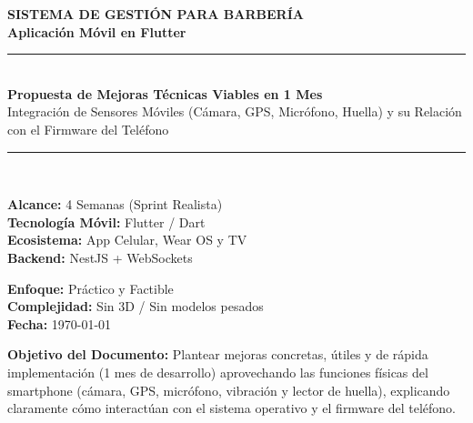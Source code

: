 \documentclass[11pt,a4paper]{article}
\begin{document}

\begin{titlepage}
    \centering
    \vspace*{1.5cm}
    
    {\Huge \textbf{\color{primaryDark}SISTEMA DE GESTIÓN PARA BARBERÍA}}\\[0.4cm]
    {\LARGE \textbf{\color{accentGold}Aplicación Móvil en Flutter}}\\[1.5cm]
    
    \rule{\linewidth}{1pt}\\[0.4cm]
    {\huge \bfseries Propuesta de Mejoras Técnicas Viables en 1 Mes}\\[0.3cm]
    {\Large Integración de Sensores Móviles (Cámara, GPS, Micrófono, Huella) y su Relación con el Firmware del Teléfono}\\[0.4cm]
    \rule{\linewidth}{1pt}\\[2cm]
    
    \begin{minipage}{0.48\textwidth}
        \textbf{\color{primaryDark}Alcance:} 4 Semanas (Sprint Realista)\\
        \textbf{\color{primaryDark}Tecnología Móvil:} Flutter / Dart\\
        \textbf{\color{primaryDark}Ecosistema:} App Celular, Wear OS y TV\\
        \textbf{\color{primaryDark}Backend:} NestJS + WebSockets
    \end{minipage}
    \hfill
    \begin{minipage}{0.48\textwidth}
        \flushright
        \textbf{\color{primaryDark}Enfoque:} Práctico y Factible\\
        \textbf{\color{primaryDark}Complejidad:} Sin 3D / Sin modelos pesados\\
        \textbf{\color{primaryDark}Fecha:} \today
    \end{minipage}
    
    \vfill
    
    \begin{tcolorbox}[colback=codeBg, colframe=primaryDark, arc=2mm, boxrule=0.7pt]
        \centering
        \small \textbf{Objetivo del Documento:} Plantear mejoras concretas, útiles y de rápida implementación (1 mes de desarrollo) aprovechando las funciones físicas del smartphone (cámara, GPS, micrófono, vibración y lector de huella), explicando claramente cómo interactúan con el sistema operativo y el firmware del teléfono.
    \end{tcolorbox}
    
    \vspace*{0.5cm}
\end{titlepage}
\end{document}
